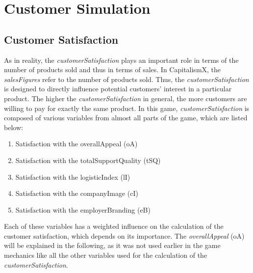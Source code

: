 \section{Customer Simulation} 
\label{sec:customsim}

\subsection{Customer Satisfaction}
\label{customerSatisfaction}

As in reality, the \textit{customerSatisfaction} plays an important role in terms of the number of products sold and thus in terms of sales. \cite{deptolla_effects_2004} In CapitalismX, the \textit{salesFigures} refer to the number of products sold.
Thus, the \textit{customerSatisfaction} is designed to directly influence potential customers' interest in a particular product. The higher the \textit{customerSatisfaction} in general, the more customers are willing to pay for exactly the same product. 
In this game, \textit{customerSatisfaction} is composed of various variables from almost all parts of the game, which are listed below:
\begin{enumerate}
      \item Satisfaction with the overallAppeal (oA)
      \item Satisfaction with the totalSupportQuality (tSQ)
      \item Satisfaction with the logisticIndex (lI)
      \item Satisfaction with the companyImage (cI)
      \item Satisfaction with the employerBranding (eB)
\end{enumerate}
Each of these variables has a weighted influence on the calculation of the customer satisfaction, which depends on its importance.
The \textit{overallAppeal} (oA) will be explained in the following, as it was not used earlier in the game mechanics like all the other variables used for the calculation of the \textit{customerSatisfaction}.


